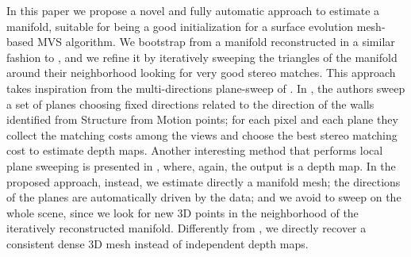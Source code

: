 In this paper we propose a novel and fully automatic approach to estimate a manifold, suitable for being a good initialization for a surface evolution mesh-based MVS algorithm.
We bootstrap from a manifold reconstructed in a similar fashion to \cite{litvinov_lhuillier_13}, and we refine it by iteratively sweeping the triangles of the manifold around their neighborhood looking for very good stereo matches.
This approach takes inspiration from the multi-directions plane-sweep of \cite{gallup2007real}.
In \cite{gallup2007real}, the authors sweep a set of planes choosing fixed directions related to the direction of the walls identified from Structure from Motion points; for each pixel and each plane they collect the matching costs among the views and choose the best stereo matching cost to estimate depth maps.
Another interesting method that performs local plane sweeping is presented in \cite{sinha2014efficient}, where, again, the output is a depth map.
In the proposed approach, instead, we estimate directly a manifold mesh; the directions of the planes are automatically driven by the data; and we avoid to sweep on the whole scene, since we look for new 3D points in the neighborhood of the iteratively reconstructed manifold. 
Differently from \cite{gallup2007real}, we directly recover a consistent dense 3D mesh instead of independent depth maps.



